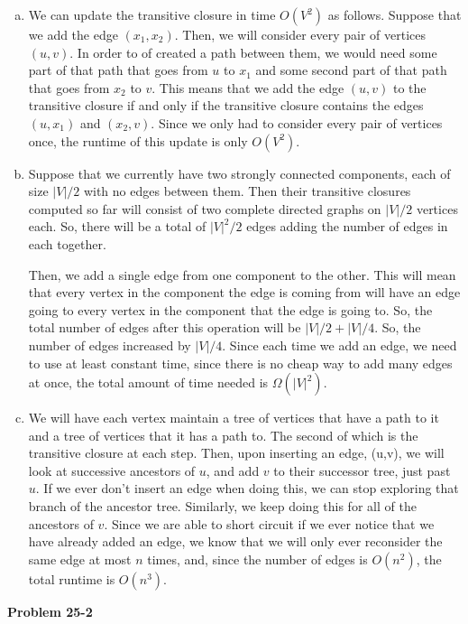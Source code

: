 \documentclass{article}
\begin{document}
\begin{enumerate}[a.]
\item
We can update the transitive closure in time $O(V^2)$ as follows. Suppose that we add the edge $(x_1,x_2)$. Then, we will consider every pair of vertices $(u,v)$. In order to of created a path between them, we would need some part of that path that goes from $u$ to $x_1$ and some second part of that path that goes from $x_2$ to $v$. This means that we add the edge $(u,v)$ to the transitive closure if and only if the transitive closure contains the edges $(u,x_1)$ and $(x_2,v)$. Since we only had to consider every pair of vertices once, the runtime of this update is only $O(V^2)$.
\item
Suppose that we currently have two strongly connected components, each of size $|V|/2$ with no edges between them. Then their transitive closures computed so far will consist of two complete directed graphs on $|V|/2$ vertices each. So, there will be a total of $|V|^2/2$ edges adding the number of edges in each together.

Then, we add a single edge from one component to the other. This will mean that every vertex in the component the edge is coming from will have an edge going to every vertex in the component that the edge is going to. So, the total number of edges after this operation will be $|V|/2 +|V|/4$. So, the number of edges increased by $|V|/4$. Since each time we add an edge, we need to use at least constant time, since there is no cheap way to add many edges at once, the total amount of time needed is $\Omega(|V|^2)$.

\item 
We will have each vertex maintain a tree of vertices that have a path to it and a tree of vertices that it has a path to. The second of which is the transitive closure at each step. Then, upon inserting an edge, (u,v), we will look at successive ancestors of $u$, and add $v$ to their successor tree, just past $u$. If we ever don't insert an edge when doing this, we can stop exploring that branch of the ancestor tree. Similarly, we keep doing this for all of the ancestors of $v$. Since we are able to short circuit if we ever notice that we have already added an edge, we know that we will only ever reconsider the same edge at most $n$ times, and, since the number of edges is $O(n^2)$, the total runtime is $O(n^3)$.
\end{enumerate}

\noindent\textbf{Problem 25-2}\\
\end{document}
